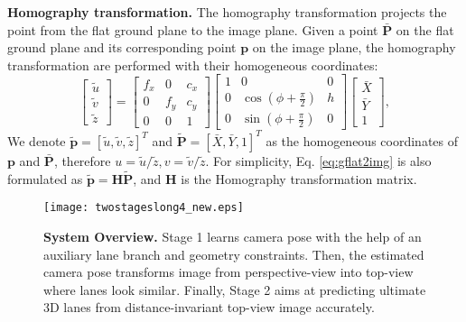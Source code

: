 \documentclass[letterpaper]{article} \usepackage{aaai22}  \usepackage{times}  \usepackage{helvet}  \usepackage{courier}  \usepackage[hyphens]{url}  \usepackage{graphicx} \urlstyle{rm} \def\UrlFont{\rm}  \usepackage{natbib}  \usepackage{caption}
\begin{document}
\noindent \textbf{Homography transformation.} 
The homography transformation projects the point from the flat ground plane to the image plane.  Given a point $\bar{\mathbf{P}}$ on the flat ground plane and its corresponding point $\mathbf{p}$ on the image plane, the homography transformation are performed with their homogeneous coordinates:
\begin{equation}
\label{eq:gflat2img}
\begin{bmatrix}
   \tilde{u} \\
   \tilde{v} \\
   \tilde{z}
\end{bmatrix}
=
\begin{bmatrix}
   f_x &0 &c_x \\
   0 &f_y &c_y \\
   0 &0 &1
\end{bmatrix}
\begin{bmatrix}
   1 &0 &0 \\
   0 &\cos \left(\phi+\frac{\pi}{2}\right) &h \\
   0 &\sin \left(\phi+\frac{\pi}{2}\right) &0
\end{bmatrix}
\begin{bmatrix}
   \bar{X} \\
   \bar{Y} \\
   1
\end{bmatrix},
\end{equation}
We denote $\tilde{\mathbf{p}}=\left[\tilde{u},\tilde{v},\tilde{z}\right]^T$ and $\tilde{\mathbf{P}}=\left[\bar{X},\bar{Y},1\right]^T$ as the homogeneous  coordinates of $\mathbf{p}$ and $\bar{\mathbf{P}}$, therefore $u=\tilde{u}/\tilde{z}, v=\tilde{v}/\tilde{z}$. For simplicity, Eq. \ref{eq:gflat2img} is also formulated as $\tilde{\mathbf{p}} = \mathbf{H} \tilde{\mathbf{P}}$, and $\mathbf{H}$ is the Homography transformation matrix. 


\begin{figure*}[t]
\begin{center}
\texttt{[image: twostageslong4\_new.eps]}
\end{center}
\caption{\textbf{System Overview.} Stage 1 learns camera pose with the help of an auxiliary lane branch and geometry constraints. Then, the estimated camera pose transforms image from perspective-view into top-view where lanes look similar. Finally, Stage 2 aims at predicting ultimate 3D lanes from distance-invariant top-view image accurately.}
\label{fig:twostages}
\end{figure*}
\end{document}
